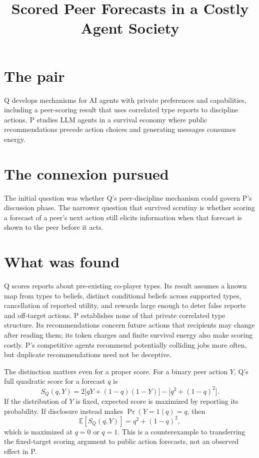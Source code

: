 \documentclass{article}
\title{Scored Peer Forecasts in a Costly Agent Society}
\begin{document}
\maketitle

\section*{The pair}

Q develops mechanisms for AI agents with private preferences and capabilities, including a peer-scoring result that uses correlated type reports to discipline actions. P studies LLM agents in a survival economy where public recommendations precede action choices and generating messages consumes energy. 

\section*{The connexion pursued}

The initial question was whether Q's peer-discipline mechanism could govern P's discussion phase. The narrower question that survived scrutiny is whether scoring a forecast of a peer's next action still elicits information when that forecast is shown to the peer before it acts. 

\section*{What was found}

Q scores reports about pre-existing co-player types. Its result assumes a known map from types to beliefs, distinct conditional beliefs across supported types, cancellation of reported utility, and rewards large enough to deter false reports and off-target actions. P establishes none of that private correlated type structure. Its recommendations concern future actions that recipients may change after reading them; its token charges and finite survival energy also make scoring costly. P's competitive agents recommend potentially colliding jobs more often, but duplicate recommendations need not be deceptive. 

The distinction matters even for a proper score. For a binary peer action \(Y\), Q's full quadratic score for a forecast \(q\) is
\[
S_Q(q,Y)
=2\bigl[qY+(1-q)(1-Y)\bigr]
-\bigl[q^2+(1-q)^2\bigr].
\]
If the distribution of \(Y\) is fixed, expected score is maximized by reporting its probability. If disclosure instead makes \(\Pr(Y=1\mid q)=q\), then
\[
\mathbb{E}[S_Q(q,Y)]=q^2+(1-q)^2,
\]
which is maximized at \(q=0\) or \(q=1\). This is a counterexample to transferring the fixed-target scoring argument to public action forecasts, not an observed effect in P. 
\end{document}
